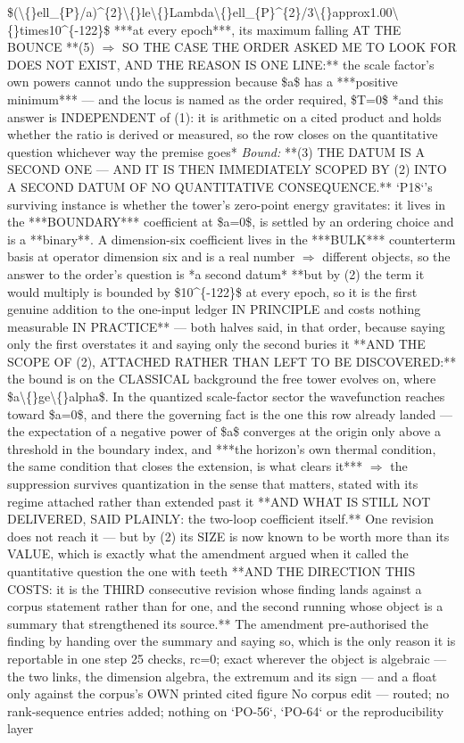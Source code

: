 \begin{description}
\$(\textbackslash\{\}ell\_\{P\}/a)\textasciicircum{}\{2\}\textbackslash\{\}le\textbackslash\{\}Lambda\textbackslash\{\}ell\_\{P\}\textasciicircum{}\{2\}/3\textbackslash\{\}approx1.00\textbackslash\{\}times10\textasciicircum{}\{-122\}\$ ***at every epoch***, its maximum falling AT THE BOUNCE  **(5) \ensuremath{\Rightarrow} SO THE CASE THE ORDER ASKED ME TO LOOK FOR DOES NOT EXIST, AND THE REASON IS ONE LINE:** the scale factor's own powers cannot undo the suppression because \$a\$ has a ***positive minimum*** --- and the locus is named as the order required, \$T=0\$  *and this answer is INDEPENDENT of (1): it is arithmetic on a cited product and holds whether the ratio is derived or measured, so the row closes on the quantitative question whichever way the premise goes*
 \emph{Bound:}  **(3) THE DATUM IS A SECOND ONE --- AND IT IS THEN IMMEDIATELY SCOPED BY (2) INTO A SECOND DATUM OF NO QUANTITATIVE CONSEQUENCE.** `P18`'s surviving instance is whether the tower's zero-point energy gravitates: it lives in the ***BOUNDARY*** coefficient at \$a=0\$, is settled by an ordering choice and is a **binary**.  A dimension-six coefficient lives in the ***BULK*** counterterm basis at operator dimension six and is a real number \ensuremath{\Rightarrow} different objects, so the answer to the order's question is *a second datum*  **but by (2) the term it would multiply is bounded by \$10\textasciicircum{}\{-122\}\$ at every epoch, so it is the first genuine addition to the one-input ledger IN PRINCIPLE and costs nothing measurable IN PRACTICE** --- both halves said, in that order, because saying only the first overstates it and saying only the second buries it   **AND THE SCOPE OF (2), ATTACHED RATHER THAN LEFT TO BE DISCOVERED:** the bound is on the CLASSICAL background the free tower evolves on, where \$a\textbackslash\{\}ge\textbackslash\{\}alpha\$.  In the quantized scale-factor sector the wavefunction reaches toward \$a=0\$, and there the governing fact is the one this row already landed --- the expectation of a negative power of \$a\$ converges at the origin only above a threshold in the boundary index, and ***the horizon's own thermal condition, the same condition that closes the extension, is what clears it*** \ensuremath{\Rightarrow} the suppression survives quantization in the sense that matters, stated with its regime attached rather than extended past it   **AND WHAT IS STILL NOT DELIVERED, SAID PLAINLY: the two-loop coefficient itself.** One revision does not reach it --- but by (2) its SIZE is now known to be worth more than its VALUE, which is exactly what the amendment argued when it called the quantitative question the one with teeth   **AND THE DIRECTION THIS COSTS: it is the THIRD consecutive revision whose finding lands against a corpus statement rather than for one, and the second running whose object is a summary that strengthened its source.**  The amendment pre-authorised the finding by handing over the summary and saying so, which is the only reason it is reportable in one step  25 checks, rc=0; exact wherever the object is algebraic --- the two links, the dimension algebra, the extremum and its sign --- and a float only against the corpus's OWN printed cited figure  No corpus edit --- routed; no rank-sequence entries added; nothing on `PO-56`, `PO-64` or the reproducibility layer

\end{description}
